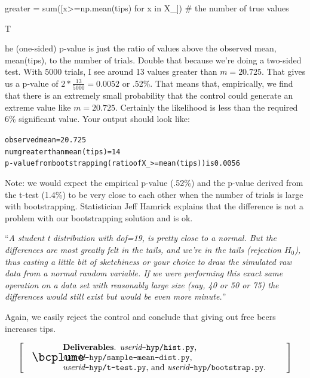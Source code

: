 \documentclass[titlepage]{tufte-book}
\makeatletter
\newcounter{problem}
\newcommand{\step}[1]{{}
\vspace{4pt} \noindent {\bf \theproblem. }#1\addtocounter{problem}{1}}
\newenvironment{callout}[1]{
\[
  \left[
      \begin{tabular}{@{\quad}m{.05\textwidth}@{\qquad}m{.75\textwidth}@{\quad}}
        \scalebox{1.5}{#1} & 
          \raggedright%
}
{
      \end{tabular}
    \right]
\]
}
\makeatother
\begin{document}
\begin{fullwidth}
\begin{pyverbatim}
greater = sum([x>=np.mean(tips) for x in X_]) # the number of true values
\end{pyverbatim}

\step The (one-sided) p-value is just the ratio of values above the observed mean, mean(tips), to the number of trials. Double that because we're doing a two-sided test.  With 5000 trials, I see around 13 values greater than $m=20.725$. That gives us a p-value of $2*\frac{13}{5000} = 0.0052$ or .52\%. That means that, empirically, we find that there is an extremely small probability that the control could generate an extreme value like $m=20.725$. Certainly the likelihood is less than the required 6\% significant value.  Your output should look like:

\begin{alltt}
observed mean = 20.725
num greater than mean(tips) = 14
p-value from bootstrapping (ratio of X_ >= mean(tips)) is 0.0056
\end{alltt}

Note: we would expect the empirical p-value (.52\%) and the p-value derived from the t-test (1.4\%) to be very close to each other when the number of trials is large with bootstrapping.  Statistician Jeff Hamrick explains that the difference is not a problem with our bootstrapping solution and is ok.

``{\em A student t distribution with dof=19, is pretty close to a normal. But the differences are most greatly felt in the tails, and we're in the tails (rejection $H_{0}$), thus casting a little bit of sketchiness or your choice to draw the simulated raw data from a normal random variable. If we were performing this exact same operation on a data set with reasonably large size (say, 40 or 50 or 75) the differences would still exist but would be even more minute.}''

Again, we easily reject the control and conclude that giving out free beers increases tips.

\begin{callout}{\bcplume}
{\bf Deliverables}. {\em userid}{\tt -hyp/hist.py}, {\em userid}{\tt -hyp/sample-mean-dist.py}, {\em userid}{\tt -hyp/t-test.py}, and {\em userid}{\tt -hyp/bootstrap.py}.
\end{callout}

\end{fullwidth}
\end{document}
